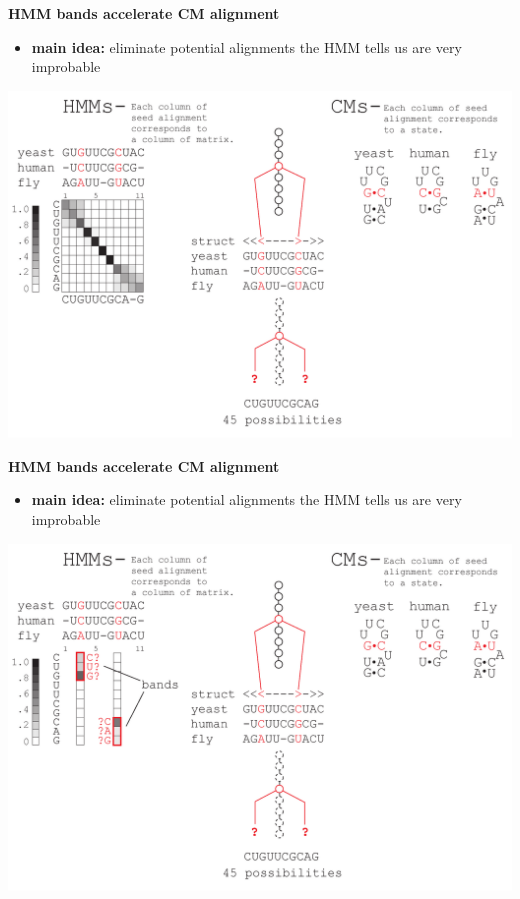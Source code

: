 \documentclass[landscape]{slides}
\begin{document}
\begin{slide}
\begin{center}

\textbf{HMM bands accelerate CM alignment}
\end{center}
\medskip
\small
\begin{itemize}
\item
\textbf{main idea:} eliminate potential alignments the HMM tells us are very improbable
\end{itemize}
\begin{center}
\includegraphics[width=8in]{figs/post_hmm_to_cm_map2_layer14}
\end{center}
\vfill
\end{slide}
\begin{slide}
\begin{center}

\textbf{HMM bands accelerate CM alignment}
\end{center}
\medskip
\small
\begin{itemize}
\item
\textbf{main idea:} eliminate potential alignments the HMM tells us are very improbable
\end{itemize}
\begin{center}
\includegraphics[width=8in]{figs/post_hmm_to_cm_map2_layer15}
\end{center}
\vfill
\end{slide}
\end{document}
